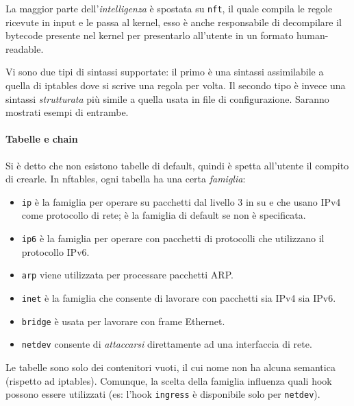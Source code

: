 La maggior parte dell'\textit{intelligenza} è spostata su \texttt{nft}, il quale compila
le regole ricevute in input e le passa al kernel, esso è anche responsabile di
decompilare il bytecode presente nel kernel per presentarlo all'utente in un
formato human-readable.

Vi sono due tipi di sintassi supportate: il primo è una sintassi assimilabile a quella
di iptables dove si scrive una regola per volta. Il secondo tipo è invece
una sintassi \textit{strutturata} più simile a quella usata in
file di configurazione. Saranno mostrati esempi di entrambe.


\paragraph{Tabelle e chain}
Si è detto che non esistono tabelle di default, quindi è spetta all'utente
il compito di crearle. In nftables, ogni tabella ha una certa \textit{famiglia}:
\begin{itemize}
	\item \texttt{ip} è la famiglia per operare su pacchetti dal livello 3 in su e
	      che usano IPv4 come protocollo di rete; è la famiglia di default se non è specificata.
	\item \texttt{ip6} è la famiglia per operare con pacchetti di protocolli che utilizzano
	      il protocollo IPv6.
	\item \texttt{arp} viene utilizzata per processare pacchetti ARP.
	\item \texttt{inet} è la famiglia che consente di lavorare con pacchetti sia IPv4
	      sia IPv6.
	\item \texttt{bridge} è usata per lavorare con frame Ethernet.
	\item \texttt{netdev} consente di \textit{attaccarsi} direttamente ad una interfaccia
	      di rete.
\end{itemize}
Le tabelle sono solo dei contenitori vuoti, il cui nome non ha alcuna semantica (rispetto
ad iptables). Comunque, la scelta della famiglia influenza quali hook possono
essere utilizzati (es: l'hook \texttt{ingress} è disponibile solo per \texttt{netdev}).

